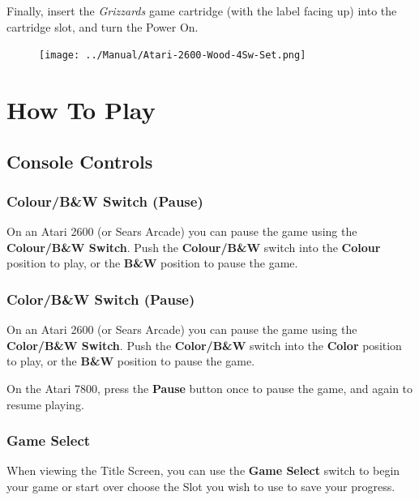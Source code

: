 \documentclass[10pt,twocolumn,openany,article]{memoir}
\begin{document}
Finally, insert  the \textit{Grizzards}  game cartridge (with  the label
facing up) into the cartridge slot, and turn the Power On.

\begin{figure}[h]
  \begin{center}
    \texttt{[image: ../Manual/Atari-2600-Wood-4Sw-Set.png]}
  \end{center}
\end{figure}


\vfill

\chapter{How To Play}

\section{Console Controls}

\ifdefined\TVSECAM
\else

\ifdefined\TVPAL
\subsection{Colour/B\&W Switch (Pause)}

On an  Atari 2600  (or Sears Arcade)  you can pause  the game  using the
\textbf{Colour/B\&W Switch}.  Push the \textbf{Colour/B\&W}  switch into
the \textbf{Colour} position  to play, or the  \textbf{B\&W} position to
pause the game.

\else

\subsection{Color/B\&W Switch (Pause)}

On an  Atari 2600  (or Sears Arcade)  you can pause  the game  using the
\textbf{Color/B\&W Switch}. Push the \textbf{Color/B\&W} switch into the
\textbf{Color} position to play, or the \textbf{B\&W} position to pause the game.

On the  Atari 7800, press  the \textbf{Pause}  button once to  pause the
game, and again to resume playing.

\fi
\fi

\subsection{Game Select}

When  viewing the  Title Screen,  you can  use the  \textbf{Game Select}
switch to \ifdefined\NOSAVE
begin your game or start over
\else
choose the Slot you wish to use to save your progress.
\fi
\end{document}
